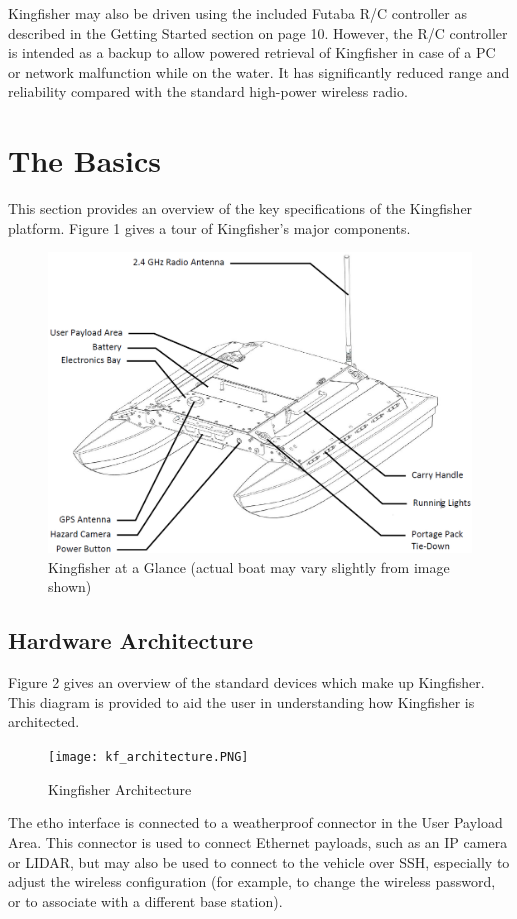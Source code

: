 \documentclass[]{clearpath-latex/clearpath-manual}
\begin{document}
Kingfisher may also be driven using the included Futaba R/C controller as described in the Getting Started section on page 10. However, the R/C controller is intended as a backup to allow powered retrieval of Kingfisher in case of a PC or network malfunction while on the water. It has significantly reduced range and reliability compared with the standard high-power wireless radio.

\section{The Basics}
This section provides an overview of the key specifications of the Kingfisher platform. Figure 1 gives a tour of Kingfisher's major components.

\begin{figure}[h]
  \centering
  \includegraphics[width=0.75\linewidth]{kf_schematic.PNG}
  \caption{Kingfisher at a Glance (actual boat may vary slightly from image shown)}
  \label{kf_the_basics}
\end{figure}
\newpage

\subsection{Hardware Architecture}
Figure 2 gives an overview of the standard devices which make up Kingfisher. This diagram is provided to aid the user in understanding how Kingfisher is architected.

\begin{figure}[h]
  \centering
  \texttt{[image: kf\_architecture.PNG]}
  \caption{Kingfisher Architecture}
  \label{kf_architechure}
\end{figure}
\newpage

The etho interface is connected to a weatherproof connector in the User Payload Area. This connector is used to connect Ethernet payloads, such as an IP camera or LIDAR, but may also be used to connect to the vehicle over SSH, especially to adjust the wireless configuration (for example, to change the wireless password, or to associate with a different base station).
\end{document}

